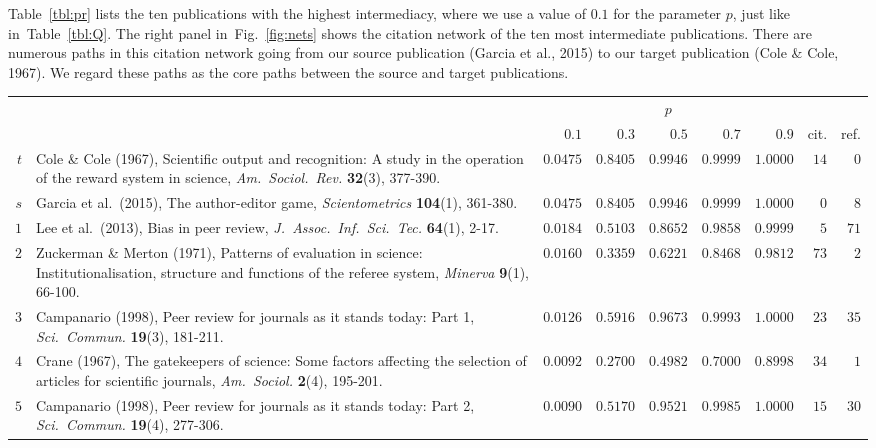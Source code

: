 \documentclass{article}
\theoremstyle{definition}
\newcommand{\figref}[1]{Fig.~\ref{fig:#1}\xspace}
\newcommand{\tblref}[1]{Table~\ref{tbl:#1}\xspace}
\begin{document}
\tblref{pr} lists the ten publications with the highest intermediacy, where we use a value of $0.1$ for the parameter $p$, just like in~\tblref{Q}. The right panel in~\figref{nets} shows the citation network of the ten most intermediate publications. There are numerous paths in this citation network going from our source publication (Garcia et al., 2015) to our target publication (Cole \& Cole, 1967). We regard these paths as the core paths between the source and target publications.

\begin{table}%
  \begin{tabular}{rp{14cm}rrrrrrr}\toprule
    & & \multicolumn{5}{c}{$p$} \\\cmidrule{3-7}
    & & $0.1$ & $0.3$ & $0.5$ & $0.7$ & $0.9$ & cit. & ref. \\\midrule
    $t$ & Cole \& Cole (1967), Scientific output and recognition: A study in the operation of the reward system in science, {\it Am.\ Sociol.\ Rev.} {\bf 32}(3), 377-390. & $0.0475$ & $0.8405$ & $0.9946$ & $0.9999$ & $1.0000$ & $14$ & $0$ \\
    $s$ & Garcia et al.\ (2015), The author-editor game, {\it Scientometrics} {\bf 104}(1), 361-380. & $0.0475$ & $0.8405$ & $0.9946$ & $0.9999$ & $1.0000$ & $0$ & $8$ \\\midrule
    $1$ & Lee et al.\ (2013), Bias in peer review, {\it J.\ Assoc.\ Inf.\ Sci.\ Tec.} {\bf 64}(1), 2-17. & $0.0184$ & $0.5103$ & $0.8652$ & $0.9858$ & $0.9999$ & $5$ & $71$ \\
    $2$ & Zuckerman \& Merton (1971), Patterns of evaluation in science: Institutionalisation, structure and functions of the referee system, {\it Minerva} {\bf 9}(1), 66-100. & $0.0160$ & $0.3359$ & $0.6221$ & $0.8468$ & $0.9812$ & $73$ & $2$ \\
    $3$ & Campanario (1998), Peer review for journals as it stands today: Part 1, {\it Sci.\ Commun.} {\bf 19}(3), 181-211. & $0.0126$ & $0.5916$ & $0.9673$ & $0.9993$ & $1.0000$ & $23$ & $35$ \\
    $4$ & Crane (1967), The gatekeepers of science: Some factors affecting the selection of articles for scientific journals, {\it Am.\ Sociol.} {\bf 2}(4), 195-201. & $0.0092$ & $0.2700$ & $0.4982$ & $0.7000$ & $0.8998$ & $34$ & $1$ \\
    $5$ & Campanario (1998), Peer review for journals as it stands today: Part 2, {\it Sci.\ Commun.} {\bf 19}(4), 277-306. & $0.0090$ & $0.5170$ & $0.9521$ & $0.9985$ & $1.0000$ & $15$ & $30$ \\

\end{tabular}
\end{table}
\end{document}
